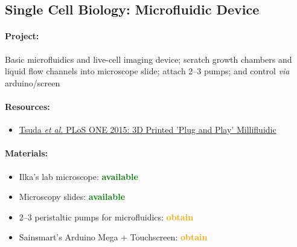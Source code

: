 \documentclass[12pt,a4paper]{scrartcl}
\newcommand{\obtain}[0]{\textcolor{orange}{\textbf{obtain}}}
\newcommand{\avail}[0]{\textcolor{green}{\textbf{available}}}
\begin{document}
\newpage
\subsection{Single Cell Biology: Microfluidic Device} 
\label{micro}

\paragraph{Project:} Basic microfluidics and live-cell imaging device;
scratch growth chambers and liquid flow channels into microscope slide;
attach 2--3 pumps; and control \textit{via} arduino/screen

\paragraph{Resources:}
\begin{itemize}
\item \href{http://www.ncbi.nlm.nih.gov/pmc/articles/PMC4641590/}{Tsuda \textit{et al.} PLoS ONE 2015: 3D Printed 'Plug and Play' Millifluidic}
\end{itemize}

\paragraph{Materials:}
\begin{itemize}
\item Ilka's lab microscope: \avail{}
\item Microscopy slides: \avail{}
\item 2--3 peristaltic pumps for microfluidics: \obtain{}
\item Sainsmart's Arduino Mega + Touchscreen: \obtain{}
\end{itemize}


\clearpage


%
\end{document}
